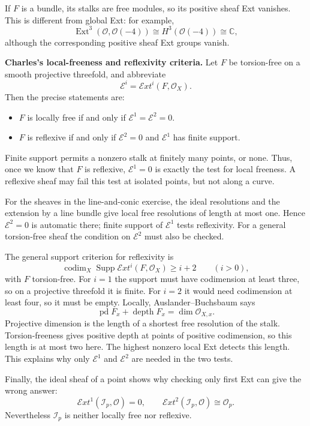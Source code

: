 \documentclass[11pt,a4paper]{article}
\theoremstyle{remark}
\begin{document}
If $F$ is a bundle, its stalks are free
modules, so its positive sheaf Ext
vanishes. This is different from global
Ext: for example,
$$
\operatorname{Ext}^3
(\mathcal{O},\mathcal{O}(-4))
\cong H^3(\mathcal{O}(-4))
\cong\mathbb{C},
$$
although the corresponding positive
sheaf Ext groups vanish.

\newpage
\textbf{Charles's local-freeness and
reflexivity criteria.}
Let $F$ be torsion-free on a smooth
projective threefold, and abbreviate
$$
\mathcal{E}^i=
\mathcal{E}xt^i(F,\mathcal{O}_X).
$$
Then the precise statements are:
\begin{itemize}
\item $F$ is locally free if and only
if $\mathcal{E}^1=\mathcal{E}^2=0$.
\item $F$ is reflexive if and only
if $\mathcal{E}^2=0$ and
$\mathcal{E}^1$ has finite support.
\end{itemize}
Finite support permits a nonzero stalk
at finitely many points, or none.
Thus, once we know that $F$ is reflexive,
$\mathcal{E}^1=0$ is exactly the test
for local freeness. A reflexive sheaf
may fail this test at isolated points,
but not along a curve.

For the sheaves in the line-and-conic
exercise, the ideal resolutions and
the extension by a line bundle give
local free resolutions of length at
most one. Hence $\mathcal{E}^2=0$
is automatic there; finite support
of $\mathcal{E}^1$ tests reflexivity.
For a general torsion-free sheaf the
condition on $\mathcal{E}^2$ must also
be checked.

The general support criterion for
reflexivity is \cite{hl}
$$
\operatorname{codim}_X\operatorname{Supp}
\mathcal{E}xt^i(F,\mathcal{O}_X)
\geq i+2\qquad(i>0),
$$
with $F$ torsion-free. For $i=1$ the
support must have codimension at least
three, so on a projective threefold
it is finite. For $i=2$ it would need
codimension at least four, so it must
be empty.
Locally, Auslander--Buchsbaum says
$$
\operatorname{pd}F_x+
\operatorname{depth}F_x
=\dim\mathcal{O}_{X,x}.
$$
Projective dimension is the length of
a shortest free resolution of the
stalk. Torsion-freeness gives positive
depth at points of positive codimension,
so this length is at most two here.
The highest nonzero local Ext detects
this length. This explains why only
$\mathcal{E}^1$ and $\mathcal{E}^2$ are
needed in the two tests.

Finally, the ideal sheaf of a point
shows why checking only first Ext
can give the wrong answer:
$$
\mathcal{E}xt^1(\mathcal{I}_p,
\mathcal{O})=0,\qquad
\mathcal{E}xt^2(\mathcal{I}_p,
\mathcal{O})\cong\mathcal{O}_p.
$$
Nevertheless $\mathcal{I}_p$ is neither
locally free nor reflexive.
\end{document}
